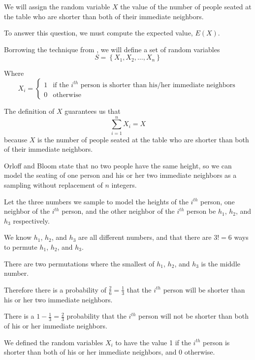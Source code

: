 \documentclass[a4paper,11pt]{article}
\begin{document}
We will assign the random variable $X$ the value of the number of
people seated at the table who are shorter than both of their
immediate neighbors.

To answer this question, we must compute the expected value, 
$E\left( X \right)$.

Borrowing the technique from \cite{probSet2}, we will define a set
of random variables 
\begin{equation}
  S = \left\{ X_{1}, X_{2}, \ldots, X_{n} \right\}
\end{equation}

Where 
\[
X_{i} = 
\begin{cases}
  1 & \text{if the } i^{th} \text{ person is shorter than 
    his/her immediate neighbors} \\
  0 & \text{otherwise}
\end{cases}
\]

The definition of $X$ guarantees us that
\begin{equation}
\sum_{i=1}^{n} X_{i} = X
\end{equation}
because $X$ is the number of people seated at the table who are shorter
than both of their immediate neighbors.

Orloff and Bloom state that no two people have the same height, so we
can model the seating of one person and his or her two immediate 
neighbors as a sampling without replacement of $n$ integers.

Let the three numbers we sample to model the heights of the $i^{th}$
person, one neighbor of the $i^{th}$ person, and the other neighbor of
the $i^{th}$ person be $h_{1}$, $h_{2}$, and $h_{3}$ respectively.

We know $h_{1}$, $h_{2}$, and $h_{3}$ are all different numbers, and
that there are $3! = 6$ ways to permute  $h_{1}$, $h_{2}$, and $h_{3}$.

There are two permutations where the smallest of $h_{1}$, $h_{2}$, 
and $h_{3}$ is the middle number.

Therefore there is a probability of $\frac{2}{6} = \frac{1}{3}$ that
the $i^{th}$ person will be shorter than his or her two immediate
neighbors.  

There is a $ 1 - \frac{1}{3} = \frac{2}{3}$ probability that the
$i^{th}$ person will not be shorter than both of his or her immediate
neighbors.

We defined the random variables $X_{i}$ to have the value 1 if the
$i^{th}$ person is shorter than both of his or her immediate neighbors,
and 0 otherwise.
\end{document}
